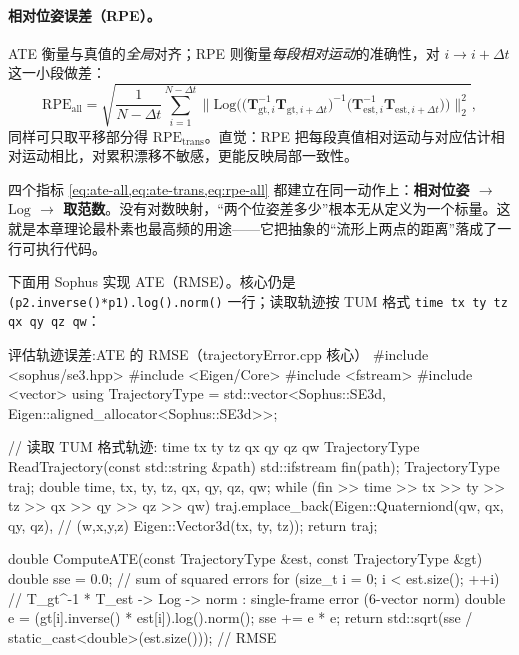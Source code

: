 \paragraph{相对位姿误差（RPE）。}ATE 衡量与真值的\emph{全局}对齐；RPE 则衡量\emph{每段相对运动}的准确性，对 $i\to i+\Delta t$ 这一小段做差：
\begin{equation}
  \mathrm{RPE}_{\text{all}}=\sqrt{\frac{1}{N-\Delta t}\sum_{i=1}^{N-\Delta t}\Big\|\mathrm{Log}\Big(\big(\mathbf{T}_{\mathrm{gt},i}^{-1}\mathbf{T}_{\mathrm{gt},i+\Delta t}\big)^{-1}\big(\mathbf{T}_{\mathrm{est},i}^{-1}\mathbf{T}_{\mathrm{est},i+\Delta t}\big)\Big)\Big\|_2^2},
  \label{eq:rpe-all}
\end{equation}
同样可只取平移部分得 $\mathrm{RPE}_{\text{trans}}$。直觉：RPE 把每段真值相对运动与对应估计相对运动相比，对累积漂移不敏感，更能反映局部一致性。

\begin{insight}
四个指标 \cref{eq:ate-all,eq:ate-trans,eq:rpe-all} 都建立在同一动作上：\textbf{相对位姿 $\to$ $\mathrm{Log}$ $\to$ 取范数}。没有对数映射，“两个位姿差多少”根本无从定义为一个标量。这就是本章理论最朴素也最高频的用途——它把抽象的“流形上两点的距离”落成了一行可执行代码。
\end{insight}

下面用 Sophus 实现 ATE（RMSE）。核心仍是 \texttt{(p2.\allowbreak inverse()*p1).\allowbreak log().\allowbreak norm()} 一行；读取轨迹按 TUM 格式 \texttt{time tx ty tz qx qy qz qw}：

\begin{codebox}[C++]{评估轨迹误差:ATE 的 RMSE（trajectoryError.cpp 核心）}
#include <sophus/se3.hpp>
#include <Eigen/Core>
#include <fstream>
#include <vector>
using TrajectoryType =
    std::vector<Sophus::SE3d, Eigen::aligned_allocator<Sophus::SE3d>>;

// 读取 TUM 格式轨迹: time tx ty tz qx qy qz qw
TrajectoryType ReadTrajectory(const std::string &path) {
  std::ifstream fin(path);
  TrajectoryType traj;
  double time, tx, ty, tz, qx, qy, qz, qw;
  while (fin >> time >> tx >> ty >> tz >> qx >> qy >> qz >> qw)
    traj.emplace_back(Eigen::Quaterniond(qw, qx, qy, qz),  // (w,x,y,z)
                      Eigen::Vector3d(tx, ty, tz));
  return traj;
}

double ComputeATE(const TrajectoryType &est, const TrajectoryType &gt) {
  double sse = 0.0;                       // sum of squared errors
  for (size_t i = 0; i < est.size(); ++i) {
    // T_gt^-1 * T_est -> Log -> norm : single-frame error (6-vector norm)
    double e = (gt[i].inverse() * est[i]).log().norm();
    sse += e * e;
  }
  return std::sqrt(sse / static_cast<double>(est.size()));   // RMSE
}
\end{codebox}

